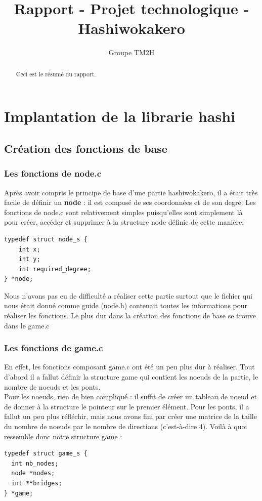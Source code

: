 \documentclass[12pt]{report}
\title{Rapport - Projet technologique - Hashiwokakero}
\author{Groupe TM2H}
\begin{document}
\maketitle

\begin{abstract}
Ceci est le résumé du rapport.
\end{abstract}

\tableofcontents

\chapter{Implantation de la librarie hashi}

\section{Création des fonctions de base}

\subsection{Les fonctions de node.c}
\textnormal{Après avoir compris le principe de base d'une partie hashiwokakero, il a était très facile de définir un \textbf{node} : il est composé de ses coordonnées et de son degré. Les fonctions de node.c sont relativement simples puisqu'elles sont simplement là pour créer, accéder et supprimer à la structure node définie de cette manière:}
\begin{verbatim}
typedef struct node_s {
	int x;
	int y;
	int required_degree;
} *node;
\end{verbatim}

\textnormal{Nous n'avons pas eu de difficulté a réaliser cette partie surtout que le fichier qui nous était donné comme guide (node.h) contenait toutes les informations pour réaliser les fonctions. Le plus dur dans la création des fonctions de base se trouve dans le game.c}
\subsection{Les fonctions de game.c}
\textnormal{En effet, les fonctions composant game.c ont été un peu plus dur à réaliser. Tout d'abord il a fallut définir la structure game qui contient les noeuds de la partie, le nombre de noeuds et les ponts.\\ Pour les noeuds, rien de bien compliqué : il suffit de créer un tableau de noeud et de donner à la structure le pointeur sur le premier élément. Pour les ponts, il a fallut un peu plus réfléchir, mais nous avons fini par créer une matrice de la taille du nombre de noeuds par le nombre de directions (c'est-à-dire 4). Voilà à quoi ressemble donc notre structure game :}
\begin{verbatim}
typedef struct game_s {
  int nb_nodes;
  node *nodes; 
  int **bridges;
} *game;
\end{verbatim}
\end{document}
